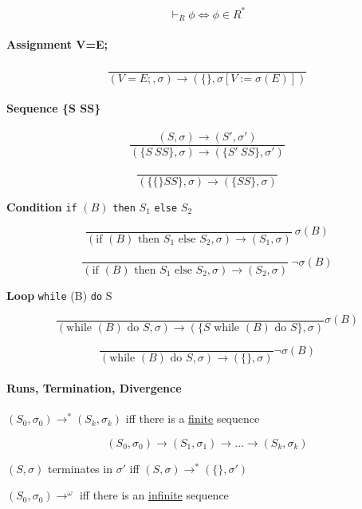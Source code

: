 \documentclass[12pt, a4paper]{book}
\begin{document}
$$
\vdash_{R} \phi \iff \phi \in R^{*}
$$

\paragraph{Assignment V=E;}

$$
\frac{}
{(V=E;,\sigma) \longrightarrow (\{ \}, \sigma [V := \sigma (E)] )}
$$

\paragraph{Sequence \{S SS\}}

$$
\frac{(S,\sigma) \longrightarrow (S',\sigma')}
{(\{ S\ SS \} , \sigma ) \longrightarrow (\{S'\ SS\}, \sigma')}
$$

$$
\frac{}
{(\{ \{ \} SS\}, \sigma) \longrightarrow (\{ SS \}, \sigma)}
$$

\noindent \textbf{Condition} \verb#if# $(B)$ \verb#then# $S_{1}$ \verb#else# $S_{2}$

$$
\frac{}
{(\textrm{if } (B) \textrm{ then } S_{1} \textrm{ else } S_{2}, \sigma) \longrightarrow (S_{1}, \sigma)}
\ \sigma(B)
$$

$$
\frac{}
{(\textrm{if } (B) \textrm{ then } S_{1} \textrm{ else } S_{2}, \sigma) \longrightarrow (S_{2}, \sigma)}
\ \lnot\sigma(B)
$$

\noindent \textbf{Loop} \verb#while# (B) \verb#do# S

$$
\frac{}
{(\textrm{while } (B) \textrm{ do } S, \sigma) \longrightarrow (\{ S \textrm{ while } (B) \textrm{ do } S\}, \sigma)}
\sigma(B)
$$

$$
\frac{}
{(\textrm{while } (B) \textrm{ do } S, \sigma) \longrightarrow (\{ \}, \sigma)}
\lnot\sigma(B)
$$

\paragraph{Runs, Termination, Divergence}

$(S_{0}, \sigma_{0}) \longrightarrow^{*} (S_{k}, \sigma_{k})$ iff there is a
\underline{finite} sequence

$$
(S_{0}, \sigma_{0}) \longrightarrow (S_{1}, \sigma_{1}) \longrightarrow \ldots
\longrightarrow (S_{k}, \sigma_{k})
$$

$(S, \sigma)$ terminates in $\sigma'$ iff $(S, \sigma) \longrightarrow^{*} (\{\}, \sigma')$

$(S_{0}, \sigma_{0}) \longrightarrow^{\omega}$ iff there is an \underline{infinite} sequence
\end{document}

